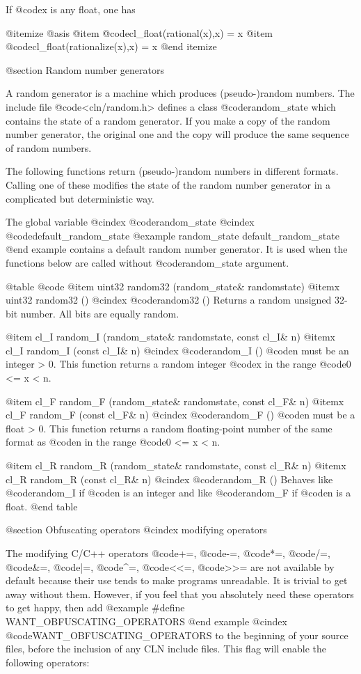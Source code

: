 If @code{x} is any float, one has

@itemize @asis
@item
@code{cl_float(rational(x),x) = x}
@item
@code{cl_float(rationalize(x),x) = x}
@end itemize


@section Random number generators


A random generator is a machine which produces (pseudo-)random numbers.
The include file @code{<cln/random.h>} defines a class @code{random_state}
which contains the state of a random generator. If you make a copy
of the random number generator, the original one and the copy will produce
the same sequence of random numbers.

The following functions return (pseudo-)random numbers in different formats.
Calling one of these modifies the state of the random number generator in
a complicated but deterministic way.

The global variable
@cindex @code{random_state}
@cindex @code{default_random_state}
@example
random_state default_random_state
@end example
contains a default random number generator. It is used when the functions
below are called without @code{random_state} argument.

@table @code
@item uint32 random32 (random_state& randomstate)
@itemx uint32 random32 ()
@cindex @code{random32 ()}
Returns a random unsigned 32-bit number. All bits are equally random.

@item cl_I random_I (random_state& randomstate, const cl_I& n)
@itemx cl_I random_I (const cl_I& n)
@cindex @code{random_I ()}
@code{n} must be an integer > 0. This function returns a random integer @code{x}
in the range @code{0 <= x < n}.

@item cl_F random_F (random_state& randomstate, const cl_F& n)
@itemx cl_F random_F (const cl_F& n)
@cindex @code{random_F ()}
@code{n} must be a float > 0. This function returns a random floating-point
number of the same format as @code{n} in the range @code{0 <= x < n}.

@item cl_R random_R (random_state& randomstate, const cl_R& n)
@itemx cl_R random_R (const cl_R& n)
@cindex @code{random_R ()}
Behaves like @code{random_I} if @code{n} is an integer and like @code{random_F}
if @code{n} is a float.
@end table


@section Obfuscating operators
@cindex modifying operators

The modifying C/C++ operators @code{+=}, @code{-=}, @code{*=}, @code{/=},
@code{&=}, @code{|=}, @code{^=}, @code{<<=}, @code{>>=}
are not available by default because their
use tends to make programs unreadable. It is trivial to get away without
them. However, if you feel that you absolutely need these operators
to get happy, then add
@example
#define WANT_OBFUSCATING_OPERATORS
@end example
@cindex @code{WANT_OBFUSCATING_OPERATORS}
to the beginning of your source files, before the inclusion of any CLN
include files. This flag will enable the following operators:

